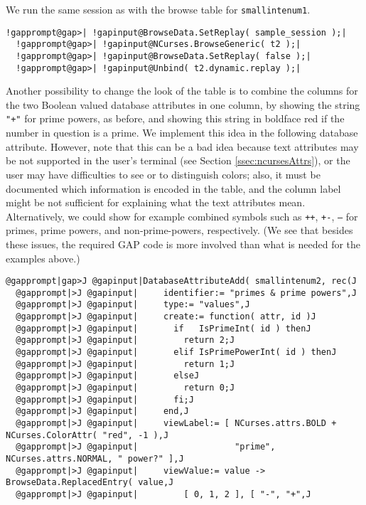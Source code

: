 \documentclass[a4paper,11pt]{report}
\begin{document}
{{\begin{Verbatim}[commandchars=@|G,fontsize=\small,frame=single,label=Example]
\end{Verbatim}
 We run the same session as with the browse table for \texttt{smallintenum1}. 
\begin{Verbatim}[commandchars=!@|,fontsize=\small,frame=single,label=Example]
  !gapprompt@gap>| !gapinput@BrowseData.SetReplay( sample_session );|
  !gapprompt@gap>| !gapinput@NCurses.BrowseGeneric( t2 );|
  !gapprompt@gap>| !gapinput@BrowseData.SetReplay( false );|
  !gapprompt@gap>| !gapinput@Unbind( t2.dynamic.replay );|
\end{Verbatim}
 Another possibility to change the look of the table is to combine the columns
for the two Boolean valued database attributes in one column, by showing the
string \texttt{"+"} for prime powers, as before, and showing this string in boldface red if the
number in question is a prime. We implement this idea in the following
database attribute. However, note that this can be a bad idea because text
attributes may be not supported in the user's terminal (see Section \ref{ssec:ncursesAttrs}), or the user may have difficulties to see or to distinguish colors; also, it
must be documented which information is encoded in the table, and the column
label might be not sufficient for explaining what the text attributes mean.
Alternatively, we could show for example combined symbols such as \texttt{++}, \texttt{+-}, \texttt{--} for primes, prime powers, and non-prime-powers, respectively. (We see that
besides these issues, the required \textsf{GAP} code is more involved than what is needed for the examples above.) 
\begin{Verbatim}[commandchars=@|J,fontsize=\small,frame=single,label=Example]
  @gapprompt|gap>J @gapinput|DatabaseAttributeAdd( smallintenum2, rec(J
  @gapprompt|>J @gapinput|     identifier:= "primes & prime powers",J
  @gapprompt|>J @gapinput|     type:= "values",J
  @gapprompt|>J @gapinput|     create:= function( attr, id )J
  @gapprompt|>J @gapinput|       if   IsPrimeInt( id ) thenJ
  @gapprompt|>J @gapinput|         return 2;J
  @gapprompt|>J @gapinput|       elif IsPrimePowerInt( id ) thenJ
  @gapprompt|>J @gapinput|         return 1;J
  @gapprompt|>J @gapinput|       elseJ
  @gapprompt|>J @gapinput|         return 0;J
  @gapprompt|>J @gapinput|       fi;J
  @gapprompt|>J @gapinput|     end,J
  @gapprompt|>J @gapinput|     viewLabel:= [ NCurses.attrs.BOLD + NCurses.ColorAttr( "red", -1 ),J
  @gapprompt|>J @gapinput|                   "prime", NCurses.attrs.NORMAL, " power?" ],J
  @gapprompt|>J @gapinput|     viewValue:= value -> BrowseData.ReplacedEntry( value,J
  @gapprompt|>J @gapinput|         [ 0, 1, 2 ], [ "-", "+",J

\end{Verbatim}}}
\end{document}
